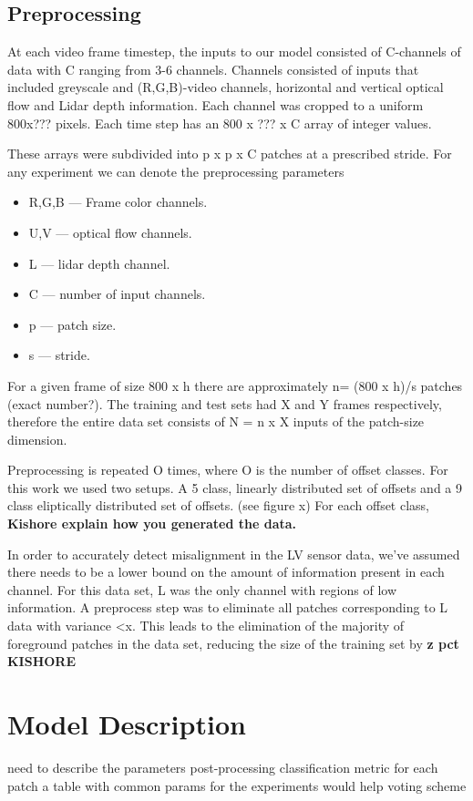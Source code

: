 \documentclass{article}
\begin{document}
\subsection{Preprocessing}
At each video frame timestep, the inputs to our model consisted of C-channels of data with C ranging from 3-6 channels. Channels consisted of inputs that included greyscale and (R,G,B)-video channels, horizontal and vertical optical flow and Lidar depth information. Each channel was cropped to a uniform 800x??? pixels. Each time step has an 800 x ??? x C array of integer values.

These arrays were subdivided into p x p x C patches at a prescribed stride. For any experiment we can denote the preprocessing parameters 
\begin{itemize}
\item R,G,B --- Frame color channels.
\item U,V --- optical flow channels.
\item L --- lidar depth channel.
\item C --- number of input channels.
\item p --- patch size.
\item s --- stride.
\end{itemize}  

For a given frame of size 800 x h there are approximately n= (800 x h)/s patches (exact number?). The training and test sets had X and Y frames respectively, therefore the entire data set consists of  N = n x X inputs of the patch-size dimension. 

Preprocessing is repeated O times, where O is the number of offset classes. For this work we used two setups. A 5 class, linearly distributed set of offsets and a 9 class eliptically distributed set of offsets. (see figure x) For each offset class, \textbf{Kishore explain how you generated the data.} 

In order to accurately detect misalignment in the LV sensor data, we've assumed there needs to be a lower bound on the amount of information present in each channel. For this data set, L was the only channel with regions of low information. A preprocess step was to eliminate all patches corresponding to L data with variance <x. This leads to the elimination of the majority of foreground patches in the data set, reducing the size of the training set by \textbf{z pct KISHORE}

\section{Model Description}
need to describe the parameters post-processing
classification metric for each patch
a table with common params for the experiments would help
voting scheme
\end{document}
